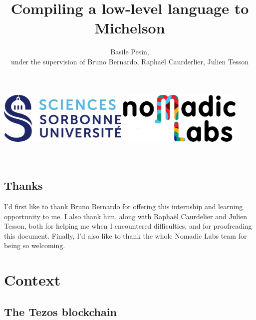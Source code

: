 \documentclass{report}
\title{Compiling a low-level language to Michelson}
\author{Basile Pesin,\\
  under the supervision of Bruno Bernardo, Raphaël Caurderlier, Julien Tesson}
\begin{document}
\makeatletter
    \begin{titlepage}
        \begin{center}
            \includegraphics[height=2.5cm]{ressources/su.jpg}
            \hspace{2cm}
            \includegraphics[height=2.5cm]{ressources/nomadic.png}\\[35ex]
            {\huge \bfseries  \@title }\\[10ex]
            {\large \@author}\\[40ex]
            {\large \@date}
        \end{center}
    \end{titlepage}
\makeatother

\vspace*{\fill}
\begin{center}
\section*{Thanks}
I'd first like to thank Bruno Bernardo for offering this internship and learning opportunity to me. I also thank him, along with Raphaël Caurdelier and Julien Tesson, both for helping me when I encountered difficulties, and for proofreading this document. Finally, I'd also like to thank the whole Nomadic Labs team for being so welcoming.
\noindent
\end{center}
\vspace*{\fill}

\tableofcontents

\chapter*{Context}

\section{The Tezos blockchain}
\end{document}
